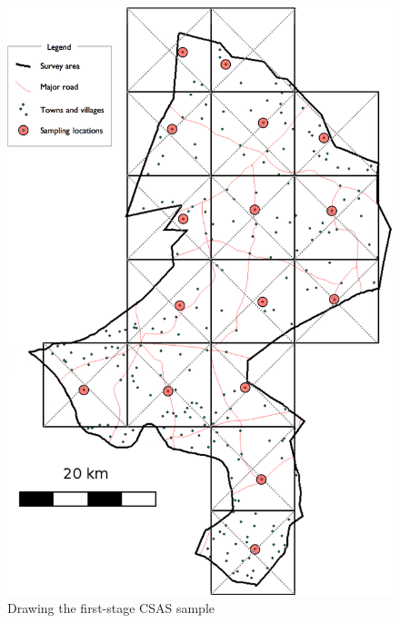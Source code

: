 \documentclass[12pt,]{book}
\theoremstyle{definition}
\theoremstyle{definition}
\theoremstyle{definition}
\theoremstyle{remark}
\begin{document}
\begin{figure}[h]

{\centering \includegraphics[width=16.67in]{figures/mapSample3} 

}

\caption{Drawing the first-stage CSAS sample}\label{fig:sample7}
\end{figure}
\end{document}
